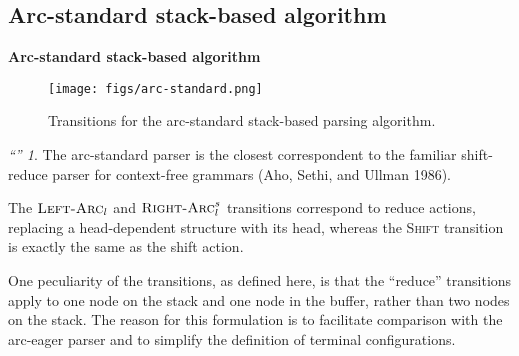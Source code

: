 \documentclass[10pt]{beamer}%
\theoremstyle{remark}
\newtheorem*{myquote}{\large``\hfill ''}
\begin{document}
\subsection{Arc-standard stack-based algorithm}

\begin{frame}
  \textbf{Arc-standard stack-based algorithm}

  \begin{figure}[H]
    \centering
    \texttt{[image: figs/arc-standard.png]}
    \caption{Transitions for the arc-standard stack-based parsing algorithm.}
  \end{figure}

  \begin{myquote}
    The arc-standard parser is the closest correspondent to the familiar shift-reduce parser for context-free grammars (Aho, Sethi, and Ullman 1986).

    \alert{The $\textsc{Left-Arc}_l$ and $\textsc{Right-Arc}^s_l$ transitions correspond to reduce actions}, replacing a head-dependent structure with its head, whereas \alert{the \textsc{Shift} transition is exactly the same as the shift action}.

    One peculiarity of the transitions, as defined here, is that the ``reduce'' transitions apply to one node on the stack and one node in the buffer, rather than two nodes on the stack. The reason for this formulation is to facilitate comparison with the arc-eager parser and to simplify the definition of terminal configurations.
  \end{myquote}

\end{frame}
\end{document}

